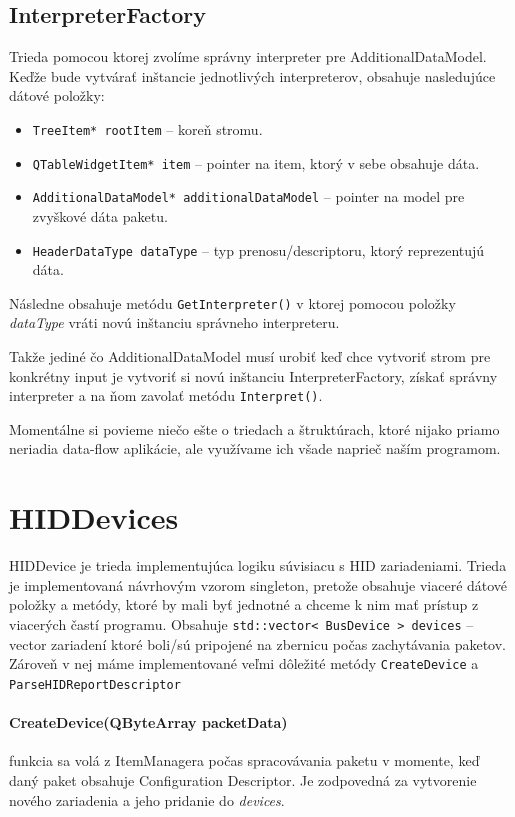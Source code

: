 \subsection{InterpreterFactory}
Trieda pomocou ktorej zvolíme správny interpreter pre AdditionalDataModel. Keďže bude vytvárať inštancie jednotlivých interpreterov, obsahuje nasledujúce dátové položky:
\begin{itemize}
\item \texttt{TreeItem* rootItem} -- koreň stromu.
\item \texttt{QTableWidgetItem* item} -- pointer na item, ktorý v sebe obsahuje dáta.
\item \texttt{AdditionalDataModel* additionalDataModel} -- pointer na model \newline pre zvyškové dáta paketu.
\item \texttt{HeaderDataType dataType} -- typ prenosu/descriptoru, ktorý reprezentujú dáta.
\end{itemize}
Následne obsahuje metódu \texttt{GetInterpreter()} v ktorej pomocou položky \textit{dataType} vráti novú inštanciu správneho interpreteru. 

Takže jediné čo AdditionalDataModel musí urobiť keď chce vytvoriť strom pre konkrétny input je vytvoriť si novú inštanciu InterpreterFactory, získať správny interpreter a na ňom zavolať metódu \texttt{Interpret()}.

Momentálne si povieme niečo ešte o triedach a štruktúrach, ktoré nijako priamo neriadia data-flow aplikácie, ale využívame ich všade naprieč naším programom.

\section{HIDDevices}
HIDDevice je trieda implementujúca logiku súvisiacu s HID zariadeniami. Trieda je implementovaná návrhovým vzorom singleton, pretože obsahuje viaceré dátové položky a metódy, ktoré by mali byť jednotné a chceme k nim mať prístup z viacerých častí programu. Obsahuje \texttt{std::vector\textless~BusDevice~\textgreater~devices} -- vector zariadení ktoré boli/sú pripojené na zbernicu počas zachytávania paketov. Zároveň v nej máme implementované veľmi dôležité metódy	 \texttt{CreateDevice} a \texttt{ParseHIDReportDescriptor}

\paragraph{CreateDevice(QByteArray packetData)} funkcia sa volá z ItemManagera počas spracovávania paketu v momente, keď daný paket obsahuje Configuration Descriptor. Je zodpovedná za vytvorenie nového zariadenia a jeho pridanie do \textit{devices}.

